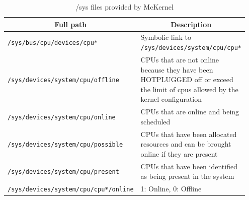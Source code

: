 \documentclass[twoside,11pt,fleqn]{book}
\begin{document}
\begin{table}[!htb]
\centering
\scriptsize
\caption{/sys files provided by McKernel}\vspace{0.0em}
\label{tab:sysfs}
\begin{tabular}{|p{0.45\linewidth}|p{0.50\linewidth}|} \hline
\multicolumn{1}{|c}{\textbf{Full path}}&\multicolumn{1}{|c|}{\textbf{Description}}\\ \hline \hline
\texttt{/sys/bus/cpu/devices/cpu*}&Symbolic link to \texttt{/sys/devices/system/cpu/cpu*}\\ \hline
\texttt{/sys/devices/system/cpu/offline}&CPUs that are not online because they have been HOTPLUGGED off or exceed the limit of cpus allowed by the kernel configuration \\ \hline
\texttt{/sys/devices/system/cpu/online}&CPUs that are online and being scheduled \\ \hline
\texttt{/sys/devices/system/cpu/possible}&CPUs that have been allocated resources and can be brought online if they are present \\ \hline
\texttt{/sys/devices/system/cpu/present}&CPUs that have been identified as being present in the system\\ \hline
\texttt{/sys/devices/system/cpu/cpu*/online}& 1: Online, 0: Offline \\ \hline


\end{tabular}
\end{table}
\end{document}
